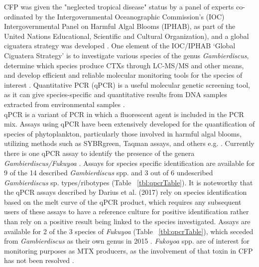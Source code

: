 \documentclass[12pt]{article}
\begin{document}
CFP was given the "neglected tropical disease" status by a panel of experts co-ordinated by the Intergovernmental Oceanographic Commission’s (IOC) Intergovernmental Panel on Harmful Algal Blooms (IPHAB), as part of the United Nations Educational, Scientific and Cultural Organization), and a global ciguatera strategy was developed \citep{globalcig}. 
One element of the IOC/IPHAB ‘Global Ciguatera Strategy’ is to  investigate various species of the genus \emph{Gambierdiscus}, determine which species produce CTXs through LC-MS/MS and other means, and develop efficient and reliable molecular monitoring tools for the species of interest \citep{globalcig}. 
Quantitative PCR (qPCR) is a useful molecular genetic screening tool, as it can give species-specific and quantitative results from DNA samples extracted from environmental samples \citep{globalcig}. \\
\FloatBarrier
qPCR is a variant of PCR in which a fluorescent agent is included in the PCR mix. 
Assays using qPCR have been extensively developed for the quantification of species of phytoplankton, particularly those involved in harmful algal blooms, utilizing methods such as SYBRgreen, Taqman assays, and others e.g. \citep{murray2011sxta,antonella2013quantitative,smith2009advantages,nishimura2016quantitative,vandersea2012development,hariganeya2013quantitative}. %
\FloatBarrier
Currently there is one qPCR assay to identify the presence of the genera \emph{Gambierdiscus/Fukuyoa} \citep{smith2017molecular}. 
Assays for species specific identification are available for 9 of the 14 described \emph{Gambierdiscus} spp. and 3 out of 6 undescribed \emph{Gambierdiscus} sp. types/ribotypes (Table ~\ref{tbl:qpcrTable}). 
It is noteworthy that the qPCR assays described by Darius et al. (2017) rely on species identification based on the melt curve of the qPCR product, which requires any subsequent users of these assays to have a reference culture for positive identification rather than rely on a positive result being linked to the species investigated. 
Assays are available for 2 of the 3 species of \emph{Fukuyoa} (Table ~\ref{tbl:qpcrTable}), which seceded from \emph{Gambierdiscus} as their own genus in 2015 \citep{gomez2015fukuyoa}. 
\textit{Fukoyoa} spp. are of interest for monitoring purposes as MTX producers, as the involvement of that toxin in CFP has not been resolved \citep{kohli2014feeding}.
\end{document}
